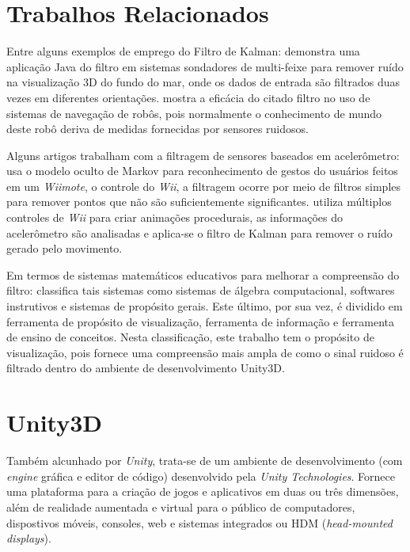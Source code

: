 \documentclass[conference]{IEEEtran}
\begin{document}
\section{Trabalhos Relacionados} \label{sec:relatedworks}

Entre alguns exemplos de emprego do Filtro de Kalman: \cite{demkowiczkalman} demonstra uma aplicação Java do filtro em sistemas sondadores de multi-feixe para remover ruído na visualização 3D do fundo do mar, onde os dados de entrada são filtrados duas vezes em diferentes orientações. \cite{choset2005principles} mostra a eficácia do citado filtro no uso de sistemas de navegação de robôs, pois normalmente o conhecimento de mundo deste robô deriva de medidas fornecidas por sensores ruidosos.

Alguns artigos trabalham com a filtragem de sensores baseados em acelerômetro: \cite{schlomer2008gesture} usa o modelo oculto de Markov para reconhecimento de gestos do usuários feitos em um \textit{Wiimote}, o controle do \textit{Wii}, a filtragem ocorre por meio de filtros simples para remover pontos que não são suficientemente significantes. \cite{shiratori2008accelerometer} utiliza múltiplos controles de \textit{Wii} para criar animações procedurais, as informações do acelerômetro são analisadas e aplica-se o filtro de Kalman para remover o ruído  gerado pelo movimento.

Em termos de sistemas matemáticos educativos para melhorar a compreensão do filtro: \cite{guyer2008computer} classifica tais sistemas como sistemas de álgebra computacional, softwares instrutivos e sistemas de propósito gerais. Este último, por sua vez, é dividido em ferramenta de propósito de visualização, ferramenta de informação e ferramenta de ensino de conceitos. Nesta classificação, este trabalho tem o propósito de visualização, pois fornece uma compreensão mais ampla de como o sinal ruidoso é filtrado dentro do ambiente de desenvolvimento Unity3D.

\section{Unity3D} \label{sec:unity3d}
Também alcunhado por \textit{Unity}, trata-se de um ambiente de desenvolvimento (com \textit{engine} gráfica e editor de código) desenvolvido pela \textit{Unity Technologies}. Fornece uma plataforma para a criação de jogos e aplicativos em duas ou três dimensões, além de realidade aumentada e virtual para o público de computadores, dispostivos móveis, consoles, web e sistemas integrados ou HDM (\textit{head-mounted displays}). 
\end{document}
